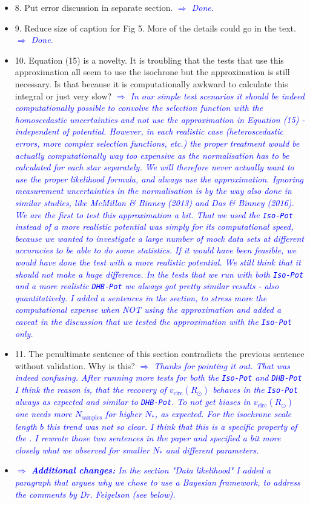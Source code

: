 \documentclass[10pt,a4paper]{article}
\newcommand{\Comment}[1]{\textsl{\textcolor{Blue}{$\Longrightarrow$ {#1}}}}
\begin{document}
\begin{itemize}
\item 8. Put error discussion in separate section. \Comment{Done.}
\item 9. Reduce size of caption for Fig 5. More of the details could go in the text. \Comment{Done.}
\item 10. Equation (15) is a novelty. It is troubling that the tests that use this approximation all seem to use the isochrone but the approximation is still necessary. Is that because it is computationally awkward to calculate this integral or just very slow? \Comment{In our simple test scenarios it should be indeed computationally possible to convolve the selection function with the homoscedastic uncertainties and not use the approximation in Equation (15) - independent of potential. However, in each realistic case (heteroscedastic errors, more complex selection functions, etc.) the proper treatment would be actually computationally way too expensive as the normalisation has to be calculated for each star separately. We will therefore never actually want to use the proper likelihood formula, and always use the approximation. Ignoring measurement uncertainties in the normalisation is by the way also done in similar studies, like McMillan \& Binney (2013) and Das \& Binney (2016). We are the first to test this approximation a bit. That we used the \texttt{Iso-Pot} instead of a more realistic potential was simply for its computational speed, because we wanted to investigate a large number of mock data sets at different accuracies to be able to do some statistics. If it would have been feasible, we would have done the test with a more realistic potential. We still think that it should not make a huge difference. In the tests that we run with both \texttt{Iso-Pot} and a more realistic \texttt{DHB-Pot} we always got pretty similar results - also quantitatively. I added a sentences in the section, to stress more the computational expense when NOT using the approximation and added a caveat in the discussion that we tested the approximation with the \texttt{Iso-Pot} only.}
\item 11. The penultimate sentence of this section contradicts the previous sentence without validation. Why is this? \Comment{Thanks for pointing it out. That was indeed confusing. After running more tests for both the \texttt{Iso-Pot} and \texttt{DHB-Pot} I think the reason is, that the recovery of $v_\text{circ}(R_\odot)$ behaves in the \texttt{Iso-Pot} always as expected and similar to \texttt{DHB-Pot}. To not get biases in $v_\text{circ}(R_\odot)$ one needs more $N_\text{samples}$ for higher $N_*$, as expected. For the isochrone scale length $b$ this trend was not so clear. I think that this is a specific property of the \text{Iso-Pot}. I rewrote those two sentences in the paper and specified a bit more closely what we observed for smaller $N_*$ and different parameters.}
\item \Comment{\textbf{Additional changes:} In the section "Data likelihood" I added a paragraph that argues why we chose to use a Bayesian framework, to address the comments by Dr. Feigelson (see below).}
\end{itemize}
\end{document}
